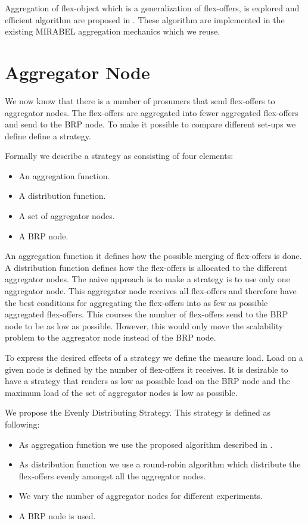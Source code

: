 \documentclass{ifacconf}
\begin{document}
Aggregation of flex-object which is a generalization of flex-offers, is explored and efficient algorithm are proposed in \cite{ssdbm}. 
These algorithm are implemented in the existing MIRABEL aggregation mechanics which we reuse.

\section{Aggregator Node}

We now know that there is a number of prosumers that send flex-offers to aggregator nodes. 
The flex-offers are aggregated into fewer aggregated flex-offers and send to the BRP node.
To make it possible to compare different set-ups we define define a strategy.

Formally we describe a strategy as consisting of four elements:
\begin{itemize}
	\item An aggregation function.
	\item A distribution function. 
	\item A set of aggregator nodes.
	\item A BRP node.
\end{itemize} 

An aggregation function it defines how the possible merging of flex-offers is done.
A distribution function defines how the flex-offers is allocated to the different aggregator nodes.
The naive approach is to make a strategy is to use only one aggregator node. 
This aggregator node receives all flex-offers and therefore have the best conditions for aggregating the flex-offers into as few as possible aggregated flex-offers. 
This courses the number of flex-offers send to the BRP node to be as low as possible. 
However, this would only move the scalability problem to the aggregator node instead of the BRP node. 

To express the desired effects of a strategy we define the measure load.
Load on a given node is defined by the number of flex-offers it receives.
It is desirable to have a strategy that renders as low as possible load on the BRP node and the maximum load of the set of aggregator nodes is low as possible.  


We propose the Evenly Distributing Strategy.
This strategy is defined as following:
\begin{itemize}
	\item As aggregation function we use the proposed algorithm described in \cite{ssdbm}.
	\item As distribution function we use a round-robin algorithm which distribute the flex-offers evenly amongst all the aggregator nodes.
	\item We vary the number of aggregator nodes for different experiments.
	\item A BRP node is used.
\end{itemize}
\end{document}
